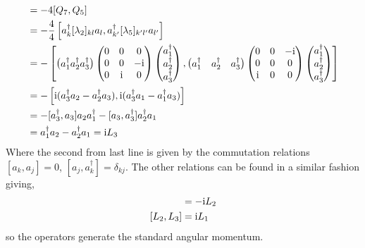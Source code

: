 \documentclass[main.tex]{subfiles}
\begin{document}
\begin{align}
[L_1,L_2]&=-4[Q_7,Q_5]\\
&=-\frac{4}{4}\left[a^{\dagger}_k[\lambda_2]_{kl}a_l,a^{\dagger}_{k'}[\lambda_5]_{k'l'}a_{l'}\right]\\
&=-\left[\begin{pmatrix} a_1^{\dagger} a_2^{\dagger} a_3^{\dagger}\end{pmatrix}
\begin{pmatrix}0&0&0\\0&0&-\img\\0&\img&0\end{pmatrix}  \begin{pmatrix}a_1^{\dagger}\\a_2^{\dagger}\\a_3^{\dagger}\end{pmatrix}, \begin{pmatrix}a_1^{\dagger}&a_2^{\dagger}&a_3^{\dagger}\end{pmatrix}  \begin{pmatrix}0&0&-\img\\0&0&0\\\img&0&0\end{pmatrix}  \begin{pmatrix}a_1^{\dagger}\\a_2^{\dagger}\\a_3^{\dagger}\end{pmatrix}\right]\\
&=-\left[\img(a_3^{\dagger}a_2-a_2^{\dagger}a_3),\img(a_3^{\dagger}a_1-a_1^{\dagger}a_3)\right]\\
&=-[a_3^{\dagger},a_3]a_2a^{\dagger}_1-[a_3,a_3^{\dagger}]a_2^{\dagger}a_1\\
&=a_1^{\dagger}a_2-a_2^{\dagger}a_1=\img L_3
\end{align}
Where the second from last line is given by the commutation relations $[a_k,a_j]=0$, $[a_j,a^{\dagger}_k]=\delta_{kj}$. The other relations can be found in a similar fashion giving,
\begin{align}
[L_1,L_3]&=-\img L_2\\
[L_2,L_3]&=\img L_1
\end{align}
so the operators generate the standard angular momentum.
\end{document}
